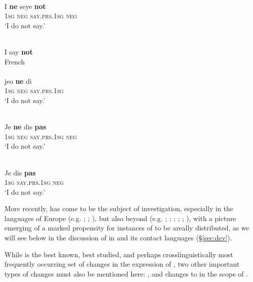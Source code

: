 \documentclass[output=paper]{langsci/langscibook}
\begin{document}
\\
\gll I \textbf{ne} seye \textbf{not}\\
     \textsc{1sg}  \textsc{neg} \textsc{\textup{say.}}\textsc{prs.1sg} \textsc{neg}  \\
\glt ‘I do not say.’


\\
 I say \textbf{not}\\
\z
\ex \label{fr}
{{French} \citep[7]{Jespersen1917}}\\
\\
\gll jeo \textbf{ne} di\\
     \textsc{1sg} \textsc{neg} \textsc{\textup{say}}.\textsc{prs.1sg}  \\
\glt  ‘I do not say.’

\\
\gll Je \textbf{ne} dis \textbf{pas}\\
     \textsc{1sg} \textsc{neg} \textsc{\textup{say}}.\textsc{prs.1sg} \textsc{neg}  \\
\glt ‘I do not say.’

\\
\gll Je dis \textbf{pas}\\
     \textsc{1sg} \textsc{\textup{say}}.\textsc{prs.1sg} \textsc{neg}  \\
\glt ‘I do not say.’
\z
\z

More recently,  has come to be the subject of  investigation, especially in the languages of Europe (e.g. \citealt{BerniniRamat1992}; \citeyear{BerniniRamat1996}; \citealt{WillisBreitbarth2013}), but also beyond (e.g. \citealt{Lucas2007}; \citeyear{Lucas2009,Lucas2013}; \citealt{LucasLash2010}; \citealt{DevosAuwera2013}; \citealt{AuweraVossen2015}; \citeyear{AuweraVossen2016,AuweraVossen2017}), with a picture emerging of a marked propensity for instances of  to be areally distributed, as we will see below in the discussion of  in  and its contact languages (§\ref{sec:dev}).

While  is the best known, best studied, and perhaps crosslinguistically most frequently occurring set of changes in the expression of , two other important types of changes must also be mentioned here: , and changes to  in the scope of .
\end{document}
